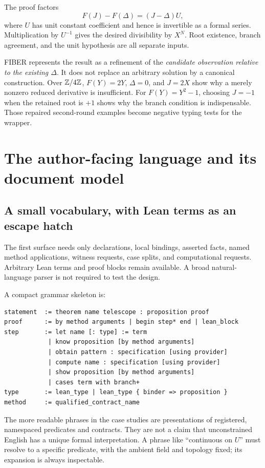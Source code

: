 \documentclass[11pt,letterpaper]{article}
\theoremstyle{definition}\newtheorem{definition}[theorem]{Definition}
\begin{document}
The proof factors
\[
 F(J)-F(\Delta)=(J-\Delta)U,
\]
where $U$ has unit constant coefficient and hence is invertible as a formal series. Multiplication by $U^{-1}$ gives the desired divisibility by $X^N$. Root existence, branch agreement, and the unit hypothesis are all separate inputs.

FIBER represents the result as a refinement of the \emph{candidate observation relative to the existing $\Delta$}. It does not replace an arbitrary solution by a canonical construction. Over $\mathbb Z/4\mathbb Z$, $F(Y)=2Y$, $\Delta=0$, and $J=2X$ show why a merely nonzero reduced derivative is insufficient. For $F(Y)=Y^2-1$, choosing $J=-1$ when the retained root is $+1$ shows why the branch condition is indispensable. Those repaired second-round examples become negative typing tests for the wrapper.

\section{The author-facing language and its document model}\label{sec:surface}
\subsection{A small vocabulary, with Lean terms as an escape hatch}
The first surface needs only declarations, local bindings, asserted facts, named method applications, witness requests, case splits, and computational requests. Arbitrary Lean terms and proof blocks remain available. A broad natural-language parser is not required to test the design.

A compact grammar skeleton is:
\begin{lstlisting}
statement  := theorem name telescope : proposition proof
proof      := by method arguments | begin step* end | lean_block
step       := let name [: type] := term
            | know proposition [by method arguments]
            | obtain pattern : specification [using provider]
            | compute name : specification [using provider]
            | show proposition [by method arguments]
            | cases term with branch+
type       := lean_type | lean_type { binder => proposition }
method     := qualified_contract_name
\end{lstlisting}
The more readable phrases in the case studies are presentations of registered, namespaced predicates and contracts. They are not a claim that unconstrained English has a unique formal interpretation. A phrase like ``continuous on $U$'' must resolve to a specific predicate, with the ambient field and topology fixed; its expansion is always inspectable.
\end{document}
